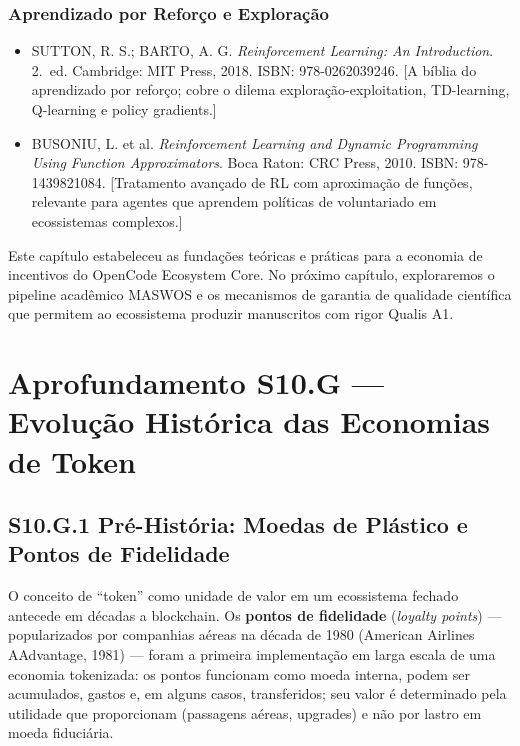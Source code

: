 \subsubsection*{Aprendizado por Reforço e Exploração}

\begin{itemize}
    \item SUTTON, R. S.; BARTO, A. G. \textit{Reinforcement Learning: An Introduction}. 2.~ed. Cambridge: MIT Press, 2018. ISBN: 978-0262039246. \cite{sutton2018reinforcement} [A bíblia do aprendizado por reforço; cobre o dilema exploração-exploitation, TD-learning, Q-learning e policy gradients.]
    
    \item BUSONIU, L. et al. \textit{Reinforcement Learning and Dynamic Programming Using Function Approximators}. Boca Raton: CRC Press, 2010. ISBN: 978-1439821084. [Tratamento avançado de RL com aproximação de funções, relevante para agentes que aprendem políticas de voluntariado em ecossistemas complexos.]
\end{itemize}

Este capítulo estabeleceu as fundações teóricas e práticas para a economia de incentivos do OpenCode Ecosystem Core. No próximo capítulo, exploraremos o pipeline acadêmico MASWOS e os mecanismos de garantia de qualidade científica que permitem ao ecossistema produzir manuscritos com rigor Qualis A1.


\section*{Aprofundamento S10.G --- Evolução Histórica das Economias de Token}

\subsection*{S10.G.1 Pré-História: Moedas de Plástico e Pontos de Fidelidade}

O conceito de ``token'' como unidade de valor em um ecossistema fechado antecede em décadas a blockchain. Os \textbf{pontos de fidelidade} (\textit{loyalty points}) --- popularizados por companhias aéreas na década de 1980 (American Airlines AAdvantage, 1981) --- foram a primeira implementação em larga escala de uma economia tokenizada: os pontos funcionam como moeda interna, podem ser acumulados, gastos e, em alguns casos, transferidos; seu valor é determinado pela utilidade que proporcionam (passagens aéreas, upgrades) e não por lastro em moeda fiduciária.

